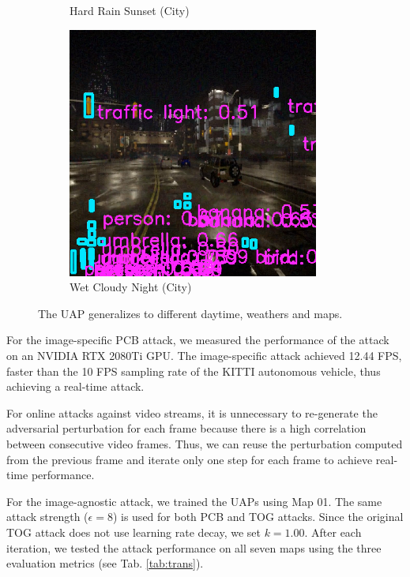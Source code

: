 \begin{figure}[H]
\begin{subfigure}[b]{0.48\textwidth}
        \caption{Hard Rain Sunset (City)}
        \label{fig:hard_rain} 
    \end{subfigure}
    \begin{subfigure}[b]{0.48\textwidth}
        \centering
        \includegraphics[width=\linewidth]{figures/chapter_detection/hardware/wet_cloudy_city.png}
        \caption{Wet Cloudy Night (City)}
        \label{fig:wet_cloudy}
    \end{subfigure}
  \caption{The UAP generalizes to different daytime, weathers and maps.}
  \label{fig:carla}
\end{figure}


For the image-specific PCB attack, we measured the performance of the attack on an NVIDIA RTX 2080Ti GPU. The image-specific attack achieved 12.44 FPS, faster than the 10 FPS sampling rate of the KITTI autonomous vehicle, thus achieving a real-time attack.

For online attacks against video streams, it is unnecessary to re-generate the adversarial perturbation for each frame because there is a high correlation between consecutive video frames. Thus, we can reuse the perturbation computed from the previous frame and iterate only one step for each frame to achieve real-time performance. 


For the image-agnostic attack, we trained the UAPs using Map 01. The same attack strength ($\epsilon=8$) is used for both PCB and TOG attacks. Since the original TOG attack does not use learning rate decay, we set $k=1.00$. After each iteration, we tested the attack performance on all seven maps using the three evaluation metrics (see Tab. \ref{tab:trans}).

